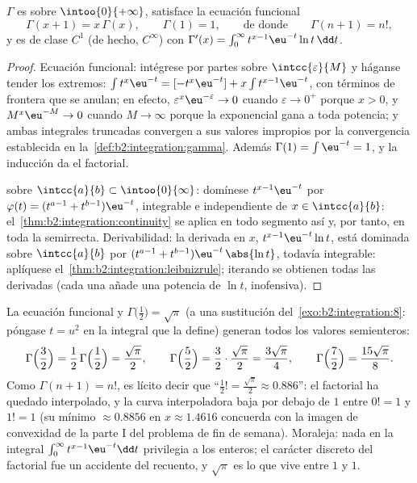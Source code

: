 \begin{theorem}\label{thm:b2:integration:gammaprops}
$\Gamma$ es  sobre $\intoo{0}{+\infty}$, satisface la
ecuación funcional
\[
\Gamma(x + 1) = x\,\Gamma(x),
\qquad \Gamma(1) = 1,
\qquad\text{de donde}\qquad \Gamma(n + 1) = n! ,
\]
y es de clase $C^1$ (de hecho, $C^\infty$) con $\Gamma'(x) =
\int_0^\infty t^{x-1}\eu^{-t}\ln t\,\dd t$.
\end{theorem}

\begin{proof}
Ecuación funcional: intégrese por partes sobre
$\intcc{\varepsilon}{M}$ y háganse tender los extremos: $\int
t^{x}\eu^{-t} = [-t^x\eu^{-t}] + x\int t^{x-1}\eu^{-t}$, con
términos de frontera que se anulan; en efecto,
$\varepsilon^x\eu^{-\varepsilon} \to 0$ cuando $\varepsilon \to 0^+$
porque $x > 0$, y $M^x\eu^{-M} \to 0$ cuando $M \to \infty$ porque
la exponencial gana a toda potencia; y ambas integrales truncadas
convergen a sus valores impropios por la convergencia establecida en
la~\cref{def:b2:integration:gamma}. Además $\Gamma(1) = \int
\eu^{-t} = 1$, y la inducción da el factorial.

 sobre $\intcc{a}{b} \subset \intoo{0}{\infty}$:
domínese $t^{x-1}\eu^{-t}$ por $\varphi(t) = (t^{a-1} +
t^{b-1})\eu^{-t}$, integrable e independiente de $x \in
\intcc{a}{b}$: el~\cref{thm:b2:integration:continuity} se aplica en
todo segmento así y, por tanto, en toda la semirrecta.
Derivabilidad: la derivada en $x$, $t^{x-1}\eu^{-t}\ln t$, está
dominada sobre $\intcc{a}{b}$ por $(t^{a-1} +
t^{b-1})\eu^{-t}\,\abs{\ln t}$, todavía integrable: aplíquese el~\cref{thm:b2:integration:leibnizrule}; iterando se obtienen todas
las derivadas (cada una añade una potencia de $\ln t$, inofensiva).
\end{proof}

\begin{example}\label{ex:b2:integration:halffactorial}
La ecuación funcional y $\Gamma\bigl(\frac12\bigr) = \sqrt\pi$ (a
una sustitución del~\cref{exo:b2:integration:8}: póngase $t = u^2$
en la integral que la define) generan todos los valores
semienteros:
\[
\Gamma\Bigl(\frac32\Bigr) = \frac12\,\Gamma\Bigl(\frac12\Bigr)
= \frac{\sqrt\pi}{2},
\qquad
\Gamma\Bigl(\frac52\Bigr) = \frac32\cdot\frac{\sqrt\pi}{2}
= \frac{3\sqrt\pi}{4},
\qquad
\Gamma\Bigl(\frac72\Bigr) = \frac{15\sqrt\pi}{8} .
\]
Como $\Gamma(n+1) = n!$, es lícito decir que ``$\frac12! =
\frac{\sqrt\pi}{2} \approx 0.886$'': el factorial ha quedado
interpolado, y la curva interpoladora baja por debajo de $1$ entre
$0! = 1$ y $1! = 1$ (su mínimo $\approx 0.8856$ en $x \approx
1.4616$ concuerda con la imagen de convexidad de la parte I del
problema de fin de semana). Moraleja: nada en la integral
$\int_0^\infty t^{x-1}\eu^{-t}\dd t$ privilegia a los enteros; el
carácter discreto del factorial fue un accidente del recuento, y
$\sqrt\pi$ es lo que vive entre $1$ y $1$.
\end{example}


